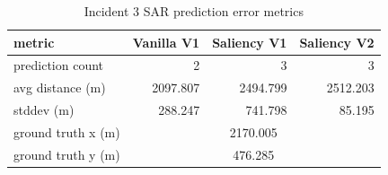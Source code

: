 \begin{table}[ht]
\centering
\caption{Incident 3 SAR prediction error metrics}
\label{tab:sar-incident-3}
\begin{tabular}{lrrr}
\hline
metric & Vanilla V1 & Saliency V1 & Saliency V2 \\
\hline
prediction count & 2 & 3 & 3 \\
avg distance (m) & 2097.807 & 2494.799 & 2512.203 \\
stddev (m) & 288.247 & 741.798 & 85.195 \\
ground truth x (m) & \multicolumn{3}{c}{2170.005} \\
ground truth y (m) & \multicolumn{3}{c}{476.285} \\
\hline
\end{tabular}
\end{table}
